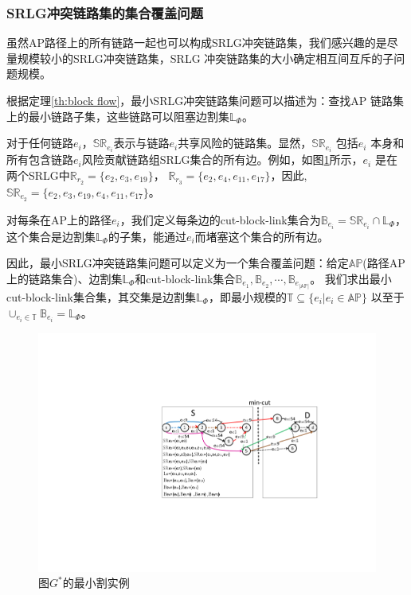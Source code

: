 \subsubsection{SRLG冲突链路集的集合覆盖问题}
\label{subsec:Set cover problem for SRLG Conflicting Link Set}
虽然AP路径上的所有链路一起也可以构成SRLG冲突链路集，我们感兴趣的是尽量规模较小的SRLG冲突链路集，SRLG 冲突链路集的大小确定相互间互斥的子问题规模。

根据定理\ref{th:block flow}，最小SRLG冲突链路集问题可以描述为：查找AP 链路集上的最小链路子集，这些链路可以阻塞边割集$\mathbb{L}_{\Phi}$。

对于任何链路$e_i$，$\mathbb{SR}_{e_i}$表示与链路$e_i$共享风险的链路集。显然，$\mathbb{SR}_{e_i}$ 包括$e_i$ 本身和所有包含链路$e_i$风险贡献链路组SRLG集合的所有边。例如，如图\ref{fig:MinCutStarGraph}所示，$e_i$ 是在两个SRLG中$\mathbb{R}_{r_2}=\{e_2,e_3,e_{19}\}$， $\mathbb{R}_{r_3}=\{e_2,e_4,e_{11},e_{17}\}$，因此, $\mathbb{SR}_{e_2}=\{e_2,e_3,e_{19},e_4,e_{11},e_{17}\}$。

对每条在AP上的路径$e_i$，我们定义每条边的cut-block-link集合为${\mathbb{B}_{{e_i}}} = \mathbb{SR}_{{e_i}} \cap \mathbb{L}_{\Phi}$，这个集合是边割集$\mathbb{L}_{\Phi}$的子集，能通过$e_i$而堵塞这个集合的所有边。

因此，最小SRLG冲突链路集问题可以定义为一个集合覆盖问题：给定$\mathbb{AP}$(路径AP上的链路集合)、边割集$\mathbb{L}_{\Phi}$和cut-block-link集合${\mathbb{B}_{{e_1}}},{\mathbb{B}_{{e_2}}}, \cdots ,{\mathbb{B}_{{e_{|\mathbb{AP}|}}}}$。 我们求出最小cut-block-link集合集，其交集是边割集$\mathbb{L}_{\Phi}$，即最小规模的$\mathbb{T} \subseteq \{e_i| e_i\in \mathbb{AP}\}$ 以至于 ${ \cup_{e_i \in \mathbb{T}}}{\mathbb{B}_{e_i}} = \mathbb{L}_{\Phi}$。


\begin{figure}[htbp]
  \centering
  \includegraphics[width=4.5in]{figures/MinCutStarGraph}
  \caption{图$G^*$的最小割实例}\label{fig:MinCutStarGraph}
  \label{fig:MinCutStarGraph}
\end{figure}

